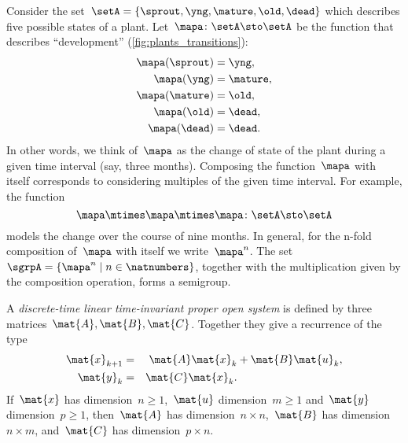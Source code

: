 \begin{example}
    \label{exa:plant-trafo-semigroup}
    Consider the set~$\setA = \{ \sprout, \yng, \mature, \old, \dead \}$ which describes five possible states of a plant.
    Let~$\mapa \colon \setA \sto \setA$ be the function that describes ``development'' (\cref{fig:plants_transitions}):
    \begin{align*}
        \mapa(\sprout) & =  \yng,    \\
        \mapa(\yng)    & =  \mature, \\
        \mapa(\mature) & =  \old,    \\
        \mapa( \old)   & = \dead,    \\
        \mapa (\dead)  & = \dead.
    \end{align*}
    In other words, we think of~$\mapa$ as the change of state of the plant during a given time interval (say, three months).
    Composing the function~$\mapa$ with itself corresponds to considering multiples of the given time interval.
    For example, the function
    \begin{equation*}
        \mapa \mtimes \mapa \mtimes \mapa \colon \setA \sto \setA
    \end{equation*}
    models the change over the course of nine months.
    In general, for the n-fold composition of~$\mapa$ with itself we write~$\mapa^n$.
    The set~$\sgrpA = \{ \mapa^n \mid n \in \natnumbers \}$, together with the multiplication given by the composition operation, forms a semigroup.
\end{example}

\begin{definition}
    \label{def:discrete-time-linear-system}
    A \emph{discrete-time linear time-invariant proper open system} is defined by three matrices~$\mat{A},\mat{B},\mat{C}$.
    Together they give a recurrence of the type
    \begin{equation}
        \label{eq:discrete-time-dynamics}
        \begin{aligned}
            \mat{x}_{k+1} & = & \mat{A} \mat{x}_k  & + \mat{B} \mat{u}_k, \\
            \mat{y}_{k}   & = & \mat{C} \mat{x}_k.
            \\
        \end{aligned}
    \end{equation}
    If~$\mat{x}$ has dimension~$n\geq1$,~$\mat{u}$ dimension~$m\geq1$ and~$\mat{y}$ dimension~$p\geq1$, then~$\mat{A}$ has dimension~$n \times n$,~$\mat{B}$ has dimension~$n \times m$, and~$\mat{C}$ has dimension~$p \times n$.
\end{definition}

